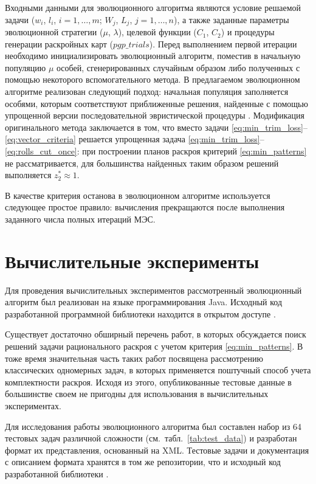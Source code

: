 \documentclass[12pt]{article}
\begin{document}
Входными данными для эволюционного алгоритма являются условие решаемой задачи 
($w_i$, $l_i$, $i=1,\ldots,m$; $W_j$, $L_j$, $j=1,\ldots,n$), а также заданные 
параметры эволюционной стратегии ($\mu$, $\lambda$), целевой функции 
($C_1$, $C_2$) и процедуры генерации раскройных карт ($pgp\_trials$). Перед 
выполнением первой итерации необходимо инициализировать эволюционный алгоритм, 
поместив в начальную популяцию $\mu$ особей, сгенерированных случайным образом 
либо полученных с помощью некоторого вспомогательного метода. В предлагаемом 
эволюционном алгоритме реализован следующий подход: начальная популяция 
заполняется особями, которым соответствуют приближенные решения, найденные 
с помощью упрощенной версии последовательной эвристической процедуры 
\cite{haessler88}. 
Модификация оригинального метода 
\cite{haessler88} 
заключается в том, что вместо задачи 
\eqref{eq:min_trim_loss}--\eqref{eq:vector_criteria} 
решается упрощенная задача 
\eqref{eq:min_trim_loss}--\eqref{eq:rolls_cut_once}: 
при построении планов раскроя 
критерий 
\eqref{eq:min_patterns} 
не рассматривается, для большинства найденных таким образом 
решений выполняется $z_2^* \approx 1$.

В качестве критерия останова в эволюционном алгоритме используется следующее 
простое правило: вычисления прекращаются после выполнения заданного числа 
полных итераций МЭС.


\section{Вычислительные эксперименты}

Для проведения вычислительных экспериментов рассмотренный эволюционный 
алгоритм был реализован на языке программирования Java. Исходный код 
разработанной программной библиотеки находится в открытом доступе
\cite{github}.

Существует достаточно обширный перечень работ, в которых обсуждается поиск 
решений задачи рационального раскроя с учетом критерия 
\eqref{eq:min_patterns}. 
В тоже время 
значительная часть таких работ посвящена рассмотрению классических одномерных 
задач, в которых применяется поштучный способ учета комплектности раскроя. 
Исходя из этого, опубликованные тестовые данные в большинстве своем не 
пригодны для использования в вычислительных экспериментах.

Для исследования работы эволюционного алгоритма был составлен набор из 64 
тестовых задач различной сложности 
(см.~табл.~\ref{tab:test_data}) 
и разработан формат их 
представления, основанный на XML. Тестовые задачи и документация с описанием 
формата хранятся в том же репозитории, что и исходный код разработанной 
библиотеки 
\cite{github}.
\end{document}
